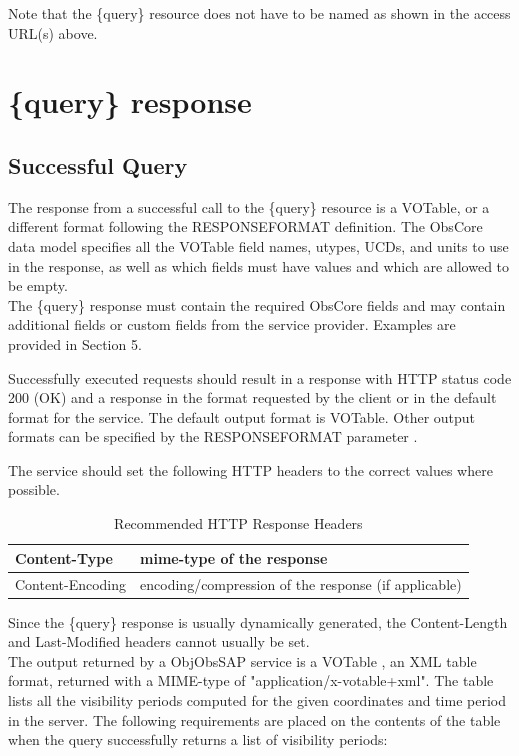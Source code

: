 \documentclass[11pt,a4paper]{ivoatex/ivoa}
\begin{document}
Note that the \{query\} resource does not have to be named as shown in
the access URL(s) above.

\section{\{query\} response}

\subsection{Successful Query}
The response from a successful call to the \{query\} resource is a
VOTable, or a different format following the RESPONSEFORMAT definition.
The ObsCore data model specifies all the VOTable \citep{2019ivoa.spec.1021O}
field names, utypes, UCDs, and units to use in the response, as well
as which fields must have values and which are allowed to be empty.\\
The \{query\} response must contain the required ObsCore \citep{2017ivoa.spec.0509L}
fields and may contain additional fields or custom fields from the service
provider. Examples are provided in Section 5.\par

Successfully executed requests should result in a response with HTTP
status code 200 (OK) and a response in the format requested by the
client or in the default format for the service. The default output
format is VOTable. Other output formats can be specified by the
RESPONSEFORMAT parameter \citep{2017ivoa.spec.0517D}.\par

The service should set the following HTTP headers to the correct values
where possible.

\begin{table}[h]
\centering
\begin{tabular}{|l|l|}
\hline
Content-Type & mime-type of the response \\
\hline
Content-Encoding & encoding/compression of the response (if applicable)
\\
\hline
\end{tabular}
\caption{Recommended HTTP Response Headers}
\end{table}
\par
Since the \{query\} response is usually dynamically generated, the
Content-Length and Last-Modified headers cannot usually be set.\\

The output returned by a ObjObsSAP service is a VOTable , an XML table
format, returned with a MIME-type of "application/x-votable+xml". The
table lists all the visibility periods computed for the given
coordinates and time period in the server. The following requirements
are placed on the contents of the table when the query successfully
returns a list of visibility periods:
\end{document}
